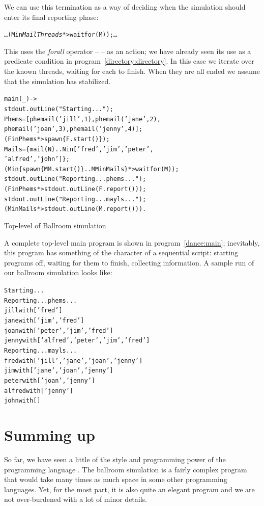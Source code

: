 We can use this termination as a way of deciding when the simulation should enter its final reporting phase:
\begin{alltt}
\ldots ( M in \emph{MailThreads} *> waitfor(M)); \ldots
\end{alltt}
This uses the \emph{forall} operator -- \q{*>} -- as an action; we have already seen its use as a predicate condition in program~\vref{directory:directory}. In this case we iterate over the known \mail threads, waiting for each to finish. When they are all ended we assume that the simulation has stabilized.

\begin{program}[tb]
\vspace{0.5ex}
\begin{alltt}
main(_) ->
  stdout.outLine("Starting...");
  Phems = [ phemail('jill',1),phemail('jane',2),
            phemail('joan',3),phemail('jenny',4)];
  (F in Phems *> spawn\{F.start()\});
  Mails = \{ mail(N) .. N in ['fred','jim','peter',
                              'alfred','john'] \};
  (M in \{ spawn\{ MM.start()\} .. MM in Mails\}*>waitfor(M));
  stdout.outLine("Reporting...phems...");
  (F in Phems *> stdout.outLine(F.report()));
  stdout.outLine("Reporting...mayls...");
  (M in Mails *> stdout.outLine(M.report())).
\end{alltt}
\vspace{-2ex}
\caption{Top-level of Ballroom simulation}
\label{dance:main}
\end{program}

A complete top-level main program is shown in program~\vref{dance:main}; inevitably, this  program has something of the character of a sequential script: starting programs off, waiting for them to finish, collecting information. A sample run of our ballroom simulation looks like:
\begin{alltt}
Starting...
Reporting...phems...
jill with ['fred']
jane with ['jim','fred']
joan with ['peter','jim','fred']
jenny with ['alfred','peter','jim','fred']
Reporting...mayls...
fred with ['jill','jane','joan','jenny']
jim with ['jane','joan','jenny']
peter with ['joan','jenny']
alfred with ['jenny']
john with []
\end{alltt}

\section{Summing up}
So far, we have seen a little of the style and programming power of the programming language \go. The ballroom simulation is a fairly complex program that would take many times as much space in some other programming languages. Yet, for the most part, it is also quite an elegant program and we are not over-burdened with a lot of minor details.


